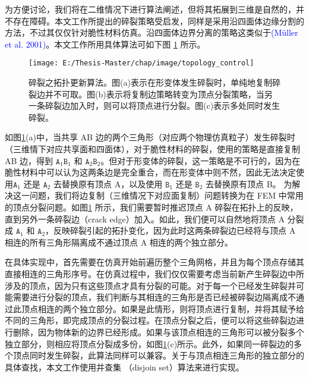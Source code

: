 为方便讨论，我们将在二维情况下进行算法阐述，但将其拓展到三维是自然的，并不存在障碍。本文工作所提出的碎裂策略受启发，同样是采用沿四面体边缘分割的方法，不过其仅仅针对脆性材料仿真。沿四面体边界分离的策略这类似于\textcolor{blue}{(M\"{u}ller et al. 2001)\parencite{Muller2001}}。本文工作所用具体算法可如下图 \ref{topology_control} 所示。

\begin{figure}[!htb]
  \centering
  \captionsetup{justification=centering}
  \texttt{[image: E:/Thesis-Master/chap/image/topology\_control]}
  \caption{\label{topology_control}
           碎裂之拓扑更新算法。图(a)表示在形变体发生碎裂时，单纯地复制碎裂边并不可取。图(b)表示将复制边策略转变为顶点分裂策略，当另一条碎裂边加入时，则可以将顶点进行分裂。图(c)表示多处同时发生碎裂。
          }
\end{figure}

如图\ref{topology_control}(a)中，当共享 AB 边的两个三角形（对应两个物理仿真粒子）发生碎裂时（三维情下对应共享面和四面体），对于脆性材料的碎裂，使用的策略是直接复制 AB 边，得到 $\texttt{A}_1\texttt{B}_1$ 和 $\texttt{A}_2\texttt{B}_2$。但对于形变体的碎裂，这一策略是不可行的，因为在脆性材料中可以认为这两条边是完全重合，而在形变体中则不然，因此无法决定使用$\texttt{A}_1$ 还是 $\texttt{A}_2$ 去替换原有顶点 A，以及使用 $\texttt{B}_1$ 还是 $\texttt{B}_2$ 去替换原有顶点 B。 为解决这一问题，我们将边复制（三维情况下对应面复制）问题转换为在 FEM 中常用的顶点分裂问题。如图\ref{topology_control} 所示，我们需要暂时推迟顶点 A 碎裂在拓扑上的反映，直到另外一条碎裂边（crack edge）加入。如此，我们便可以自然地将顶点 A 分裂成 $\texttt{A}_1$ 和 $\texttt{A}_2$，反映碎裂引起的拓扑变化，因为此时这两条碎裂边已经将与顶点 A 相连的所有三角形隔离成不通过顶点 A 相连的两个独立部分。

在具体实现中，首先需要在仿真开始前遍历整个三角网格，并且为每个顶点存储其直接相连的三角形序号。在仿真过程中，我们仅仅需要考虑当前新产生碎裂边中所涉及的顶点，因为只有这些顶点才具有分裂的可能。对于每一个已经发生碎裂并可能需要进行分裂的顶点，我们判断与其相连的三角形是否已经被碎裂边隔离成不通过此顶点相连的两个独立部分。如果是此情形，则将顶点进行复制，并将其赋予给不同的三角形，即完成顶点的分裂过程。在顶点分裂之后，便可以将这些碎裂边进行删除，因为物体新的边界已经形成。如果与该顶点相连的三角形可以被分裂多个独立部分，则相应将顶点分裂成多份，如图\ref{topology_control}(c)所示。此外，如果同一碎裂边的多个顶点同时发生碎裂，此算法同样可以兼容。关于与顶点相连三角形的独立部分的具体查找，本文工作使用并查集 （disjoin set）算法来进行实现。


